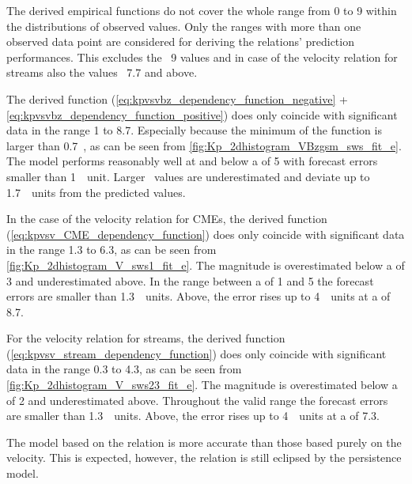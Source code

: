 The derived empirical functions do not cover the whole \Kp{} range from 0 to 9 within the distributions of observed values. Only the \Kp{} ranges with more than one observed data point are considered for deriving the relations' prediction performances. This excludes the \Kp{}~9 values and in case of the velocity relation for streams also the values \Kp{}~7.7 and above.

The derived \vBz{} function (\ref{eq:kpvsvbz_dependency_function_negative} + \ref{eq:kpvsvbz_dependency_function_positive}) does only coincide with significant data in the \Kp{} range 1 to 8.7. Especially because the minimum of the \vBz{} function is larger than 0.7~\Kp{}, as can be seen from \autoref{fig:Kp_2dhistogram_VBzgsm_sws_fit_e}. The model performs reasonably well at and below a \Kp{} of 5 with forecast errors smaller than 1~\Kp~unit. Larger \Kp~values are underestimated and deviate up to 1.7~\Kp~units from the predicted values.

In the case of the velocity relation for CMEs, the derived function (\ref{eq:kpvsv_CME_dependency_function}) does only coincide with significant data in the \Kp{} range 1.3 to 6.3, as can be seen from \autoref{fig:Kp_2dhistogram_V_sws1_fit_e}. The magnitude is overestimated below a \Kp{} of 3 and underestimated above. In the range between a \Kp{} of 1 and 5 the forecast errors are smaller than 1.3~\Kp~units. Above, the error rises up to 4~\Kp~units at a \Kp{} of 8.7.

For the velocity relation for streams, the derived function (\ref{eq:kpvsv_stream_dependency_function}) does only coincide with significant data in the \Kp{} range 0.3 to 4.3, as can be seen from \autoref{fig:Kp_2dhistogram_V_sws23_fit_e}. The magnitude is overestimated below a \Kp{} of 2 and underestimated above. Throughout the valid range the forecast errors are smaller than 1.3~\Kp~units. Above, the error rises up to 4~\Kp~units at a \Kp{} of 7.3.

The model based on the \vBz{} relation is more accurate than those based purely on the velocity. This is expected, however, the \vBz{} relation is still eclipsed by the persistence model.\\

